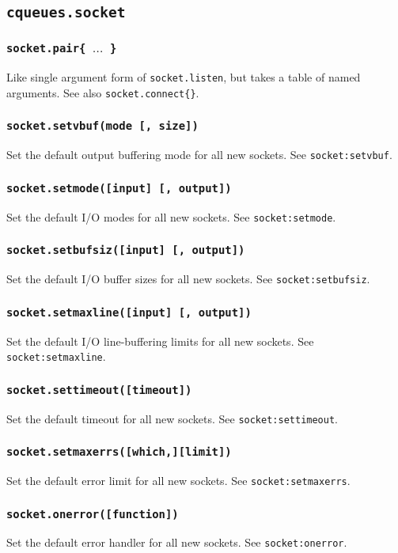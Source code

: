 \documentclass[11pt, oneside]{memoir}
\newcommand*{\fn}[1]{\texttt{#1}\xspace}
\newcounter{toccols}
\newenvironment{Module}[1]{
	\subsection{\texttt{#1}}
	\addtocontents{toc}{
		\protect\begin{multicols}{\value{toccols}}
	}
}{
	\addtocontents{toc}{\protect\end{multicols}}
}
\begin{document}
\begin{Module}{cqueues.socket}
\subsubsection[\fn{socket.pair}]{\fn{socket.pair\{ $\ldots$ \}}}
	Like single argument form of \fn{socket.listen}, but takes a table of named arguments. See also \fn{socket.connect\{\}}.

\subsubsection[\fn{socket.setvbuf}]{\fn{socket.setvbuf(mode [, size])}}
	Set the default output buffering mode for all new sockets. See \fn{socket:setvbuf}.

\subsubsection[\fn{socket.setmode}]{\fn{socket.setmode([input] [, output])}}
	Set the default I/O modes for all new sockets. See \fn{socket:setmode}.

\subsubsection[\fn{socket.setbufsiz}]{\fn{socket.setbufsiz([input] [, output])}}
	Set the default I/O buffer sizes for all new sockets. See \fn{socket:setbufsiz}.

\subsubsection[\fn{socket.setmaxline}]{\fn{socket.setmaxline([input] [, output])}}
	Set the default I/O line-buffering limits for all new sockets. See \fn{socket:setmaxline}.

\subsubsection[\fn{socket.settimeout}]{\fn{socket.settimeout([timeout])}}
	Set the default timeout for all new sockets. See \fn{socket:settimeout}.

\subsubsection[\fn{socket.setmaxerrs}]{\fn{socket.setmaxerrs([which,][limit])}}
	Set the default error limit for all new sockets. See \fn{socket:setmaxerrs}.

\subsubsection[\fn{socket.onerror}]{\fn{socket.onerror([function])}}
	Set the default error handler for all new sockets. See \fn{socket:onerror}.


\end{Module}
\end{document}
